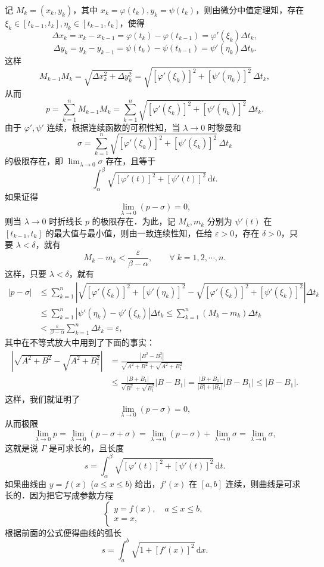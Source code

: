 记 $M_k = (x_k, y_k)$，其中 $x_k = \varphi(t_k), y_k = \psi(t_k)$，则由微分中值定理知，存在 $\xi_k \in [t_{k-1}, t_k], \eta_k \in [t_{k-1}, t_k]$，使得
\[
\Delta x_k = x_k - x_{k-1} = \varphi(t_k) - \varphi(t_{k-1}) = \varphi'(\xi_k)\Delta t_k,
\]
\[
\Delta y_k = y_k - y_{k-1} = \psi(t_k) - \psi(t_{k-1}) = \psi'(\eta_k)\Delta t_k.
\]
这样
\[
M_{k-1}M_k = \sqrt{\Delta x_k^2 + \Delta y_k^2} = \sqrt{[\varphi'(\xi_k)]^2 + [\psi'(\eta_k)]^2}\,\Delta t_k,
\]
从而
\[
p = \sum_{k=1}^n M_{k-1}M_k = \sum_{k=1}^n \sqrt{[\varphi'(\xi_k)]^2 + [\psi'(\eta_k)]^2}\,\Delta t_k.
\]
由于 $\varphi', \psi'$ 连续，根据连续函数的可积性知，当 $\lambda \to 0$ 时黎曼和
\[
\sigma = \sum_{k=1}^n \sqrt{[\varphi'(\xi_k)]^2 + [\psi'(\xi_k)]^2}\,\Delta t_k
\]
的极限存在，即 $\lim_{\lambda\to 0}\sigma$ 存在，且等于
\[
\int_\alpha^\beta \sqrt{[\varphi'(t)]^2 + [\psi'(t)]^2}\,\mathrm{d}t.
\]
如果证得
\[
\lim_{\lambda\to 0}(p - \sigma) = 0,
\]
则当 $\lambda \to 0$ 时折线长 $p$ 的极限存在．为此，记 $M_k, m_k$ 分别为 $\psi'(t)$ 在 $[t_{k-1}, t_k]$ 的最大值与最小值，则由一致连续性知，任给 $\varepsilon > 0$，存在 $\delta > 0$，只要 $\lambda < \delta$，就有
\[
M_k - m_k < \frac{\varepsilon}{\beta - \alpha}, \qquad \forall\; k = 1, 2, \cdots, n.
\]
这样，只要 $\lambda < \delta$，就有
\begin{align*}
|p - \sigma| &\leqslant \sum_{k=1}^n \left|\sqrt{[\varphi'(\xi_k)]^2 + [\psi'(\eta_k)]^2} - \sqrt{[\varphi'(\xi_k)]^2 + [\psi'(\xi_k)]^2}\right|\Delta t_k \\
&\leqslant \sum_{k=1}^n |\psi'(\eta_k) - \psi'(\xi_k)|\Delta t_k \leqslant \sum_{k=1}^n (M_k - m_k)\Delta t_k \\
&< \frac{\varepsilon}{\beta - \alpha}\sum_{k=1}^n \Delta t_k = \varepsilon,
\end{align*}
其中在不等式放大中用到了下面的事实：
\begin{align*}
\left|\sqrt{A^2 + B^2} - \sqrt{A^2 + B_1^2}\right| &= \frac{|B^2 - B_1^2|}{\sqrt{A^2 + B^2} + \sqrt{A^2 + B_1^2}} \\
&\leqslant \frac{|B + B_1|}{\sqrt{B^2} + \sqrt{B_1^2}}|B - B_1| = \frac{|B + B_1|}{|B| + |B_1|}|B - B_1| \leqslant |B - B_1|.
\end{align*}
这样，我们就证明了
\[
\lim_{\lambda\to 0}(p - \sigma) = 0,
\]
从而极限
\[
\lim_{\lambda\to 0}p = \lim_{\lambda\to 0}(p - \sigma + \sigma) = \lim_{\lambda\to 0}(p - \sigma) + \lim_{\lambda\to 0}\sigma = \lim_{\lambda\to 0}\sigma,
\]
这就是说 $\Gamma$ 是可求长的，且长度
\[
s = \int_\alpha^\beta \sqrt{[\varphi'(t)]^2 + [\psi'(t)]^2}\,\mathrm{d}t.
\]
如果曲线由 $y = f(x)$ ($a \leqslant x \leqslant b$) 给出，$f'(x)$ 在 $[a, b]$ 连续，则曲线是可求长的．因为把它写成参数方程
\[
\begin{cases}
y = f(x), \quad a \leqslant x \leqslant b, \\
x = x,
\end{cases}
\]
根据前面的公式便得曲线的弧长
\[
s = \int_a^b \sqrt{1 + [f'(x)]^2}\,\mathrm{d}x.
\]

